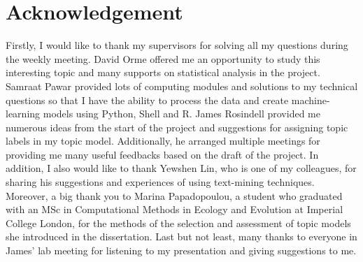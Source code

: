 \section*{Acknowledgement}

Firstly, I would like to thank my supervisors for solving all my questions during the weekly meeting. David Orme offered me an opportunity to study this interesting topic and many supports on statistical analysis in the project. Samraat Pawar provided lots of computing modules and solutions to my technical questions so that I have the ability to process the data and create machine-learning models using Python, Shell and R. James Rosindell provided me numerous ideas from the start of the project and suggestions for assigning topic labels in my topic model. Additionally, he arranged multiple meetings for providing me many useful feedbacks based on the draft of the project. In addition, I also would like to thank Yewshen Lin, who is one of my colleagues, for sharing his suggestions and experiences of using text-mining techniques. Moreover, a big thank you to Marina Papadopoulou, a student who graduated with an MSc in Computational Methods in Ecology and Evolution at Imperial College London, for the methods of the selection and assessment of topic models she introduced in the dissertation. Last but not least, many thanks to everyone in James' lab meeting for listening to my presentation and giving suggestions to me.
